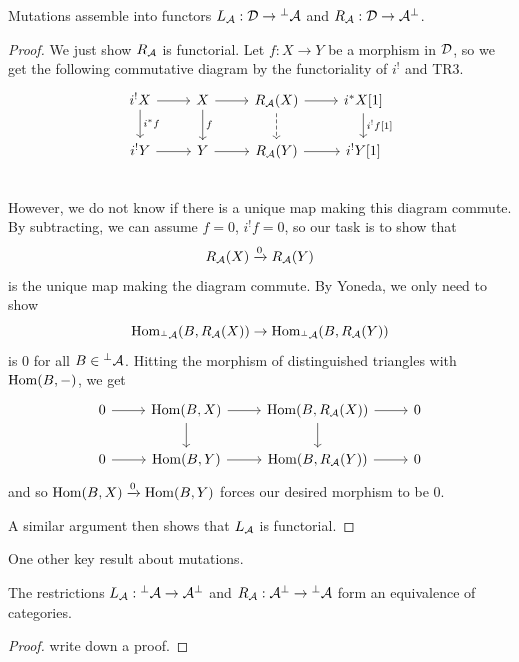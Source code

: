 \documentclass[12pt]{article}
\begin{document}
\begin{prop}
    Mutations assemble into functors $L_{\mathcal{A}}: \mathcal{D}\to {}^\perp\mathcal{A}$ and $R_{\mathcal{A}}: \mathcal{D} \to \mathcal{A}^\perp$.
\end{prop}
\begin{proof}
    We just show $R_{\mathcal{A}}$ is functorial. Let $f:X\to Y$ be a morphism in $\mathcal{D}$, so we get the following commutative diagram by the functoriality of $i^!$ and TR3.
    \[\begin{tikzcd}
        i^!X \rar \dar["{i^* f}"] & X \rar \dar["f"] & R_\cA(X) \rar \dar[dashed] & i^* X[1] \dar["{i^! f[1]}"]\\
        i^!Y \rar & Y \rar & R_\cA(Y) \rar & i^! Y[1]\\
    \end{tikzcd}\]
    However, we do not know if there is a unique map making this diagram commute. By subtracting, we can assume $f=0$, $i^! f=0$, so our task is to show that
    \[R_{\mathcal{A}}(X) \xrightarrow{0} R_{\mathcal{A}}(Y)\]
    is the unique map making the diagram commute. By Yoneda, we only need to show
    \[\mathrm{Hom}_{{}^\perp\mathcal{A}}(B, R_{\mathcal{A}}(X)) \to \mathrm{Hom}_{{}^\perp\mathcal{A}}(B, R_{\mathcal{A}}(Y))\]
    is 0 for all $B\in {}^\perp\mathcal{A}$. Hitting the morphism of distinguished triangles with $\mathrm{Hom}(B,-)$, we get
    \[\begin{tikzcd}
        0 \rar & \Hom(B,X) \rar \dar & \Hom(B,R_\cA(X)) \rar \dar & 0\\
        0 \rar & \Hom(B,Y) \rar & \Hom(B,R_\cA(Y)) \rar & 0
    \end{tikzcd}\]
    and so $\mathrm{Hom}(B,X)\xrightarrow{0} \mathrm{Hom}(B,Y)$ forces our desired morphism to be 0.

    A similar argument then shows that $L_{\mathcal{A}}$ is functorial.
\end{proof}

One other key result about mutations.

\begin{prop}
    The restrictions $L_{\mathcal{A}}: {}^\perp\mathcal{A} \to \mathcal{A}^\perp$ and $R_{\mathcal{A}}: \mathcal{A}^\perp \to {}^\perp\mathcal{A}$ form an equivalence of categories.
\end{prop}

\begin{proof}
    {\color{red} write down a proof.}
\end{proof}
\end{document}
